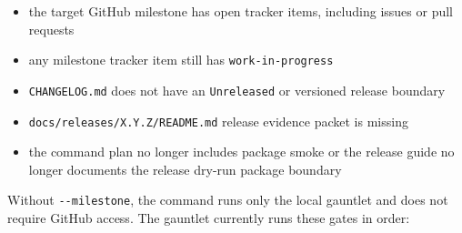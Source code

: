 \begin{itemize}
\tightlist
\item
  the target GitHub milestone has open tracker items, including issues or pull requests
\item
  any milestone tracker item still has \texttt{w\allowbreak{}o\allowbreak{}r\allowbreak{}k\allowbreak{}-\allowbreak{}i\allowbreak{}n\allowbreak{}-\allowbreak{}p\allowbreak{}r\allowbreak{}o\allowbreak{}g\allowbreak{}r\allowbreak{}e\allowbreak{}s\allowbreak{}s}
\item
  \texttt{C\allowbreak{}H\allowbreak{}A\allowbreak{}N\allowbreak{}G\allowbreak{}E\allowbreak{}L\allowbreak{}O\allowbreak{}G\allowbreak{}.\allowbreak{}m\allowbreak{}d} does not have an \texttt{U\allowbreak{}n\allowbreak{}r\allowbreak{}e\allowbreak{}l\allowbreak{}e\allowbreak{}a\allowbreak{}s\allowbreak{}e\allowbreak{}d} or versioned release boundary
\item
  \texttt{d\allowbreak{}o\allowbreak{}c\allowbreak{}s\allowbreak{}/\allowbreak{}r\allowbreak{}e\allowbreak{}l\allowbreak{}e\allowbreak{}a\allowbreak{}s\allowbreak{}e\allowbreak{}s\allowbreak{}/\allowbreak{}X\allowbreak{}.\allowbreak{}Y\allowbreak{}.\allowbreak{}Z\allowbreak{}/\allowbreak{}R\allowbreak{}E\allowbreak{}A\allowbreak{}D\allowbreak{}M\allowbreak{}E\allowbreak{}.\allowbreak{}m\allowbreak{}d} release evidence packet is missing
\item
  the command plan no longer includes package smoke or the release guide no longer documents the release dry-run package boundary
\end{itemize}

Without \texttt{-\allowbreak{}-\allowbreak{}m\allowbreak{}i\allowbreak{}l\allowbreak{}e\allowbreak{}s\allowbreak{}t\allowbreak{}o\allowbreak{}n\allowbreak{}e}, the command runs only the local gauntlet and does not require GitHub access. The gauntlet currently runs these gates in order:

